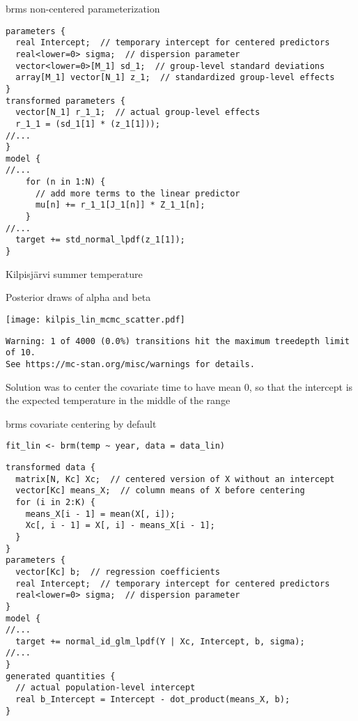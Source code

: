 \documentclass[finnish,english,t]{beamer}
\begin{document}
\begin{frame}[fragile]{brms non-centered parameterization}

  \vspace{-\baselineskip}
\begin{verbatim}
parameters {
  real Intercept;  // temporary intercept for centered predictors
  real<lower=0> sigma;  // dispersion parameter
  vector<lower=0>[M_1] sd_1;  // group-level standard deviations
  array[M_1] vector[N_1] z_1;  // standardized group-level effects
}
transformed parameters {
  vector[N_1] r_1_1;  // actual group-level effects
  r_1_1 = (sd_1[1] * (z_1[1]));
//...
}
model {
//...
    for (n in 1:N) {
      // add more terms to the linear predictor
      mu[n] += r_1_1[J_1[n]] * Z_1_1[n];
    }
//...
  target += std_normal_lpdf(z_1[1]);
}
\end{verbatim}

\end{frame}

\begin{frame}[fragile]{Kilpisjärvi summer temperature}
  
  Posterior draws of alpha and beta
  
  \begin{center}
    \texttt{[image: kilpis\_lin\_mcmc\_scatter.pdf]}
  \end{center}

\scriptsize
\begin{verbatim}
Warning: 1 of 4000 (0.0%) transitions hit the maximum treedepth limit of 10.
See https://mc-stan.org/misc/warnings for details.
\end{verbatim}
\pause
\small
Solution was to center the covariate time to have mean 0, so that the
intercept is the expected temperature in the middle of the range
  
\end{frame}

\begin{frame}{brms covariate centering by default}

  \vspace{-0.75\baselineskip}
\begin{verbatim}
fit_lin <- brm(temp ~ year, data = data_lin)
\end{verbatim}
\pause
\begin{verbatim}
transformed data {
  matrix[N, Kc] Xc;  // centered version of X without an intercept
  vector[Kc] means_X;  // column means of X before centering
  for (i in 2:K) {
    means_X[i - 1] = mean(X[, i]);
    Xc[, i - 1] = X[, i] - means_X[i - 1];
  }
}
parameters {
  vector[Kc] b;  // regression coefficients
  real Intercept;  // temporary intercept for centered predictors
  real<lower=0> sigma;  // dispersion parameter
}
model {
//...
  target += normal_id_glm_lpdf(Y | Xc, Intercept, b, sigma);
//...
}
generated quantities {
  // actual population-level intercept
  real b_Intercept = Intercept - dot_product(means_X, b);
}
\end{verbatim}

\end{frame}
\end{document}
